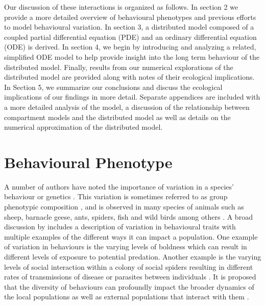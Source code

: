 \documentclass[review,authoryear]{elsarticle}
\begin{document}
Our discussion of these interactions is organized as follows. In section 2 we  provide a more detailed overview of behavioural phenotypes and previous efforts to model behavioural variation. In section 3, a distributed model composed of a coupled partial differential equation (PDE) and an ordinary differential equation (ODE) is derived. 
In section 4, we begin by introducing and analyzing a related, simplified ODE model to help provide insight into the long term behaviour of the distributed model. Finally, results from our numerical explorations of the distributed model are provided along with notes of their ecological implications. In Section 5, we summarize our conclusions and discuss the ecological implications of our findings in more detail.  Separate appendices are included with a more detailed analysis of the model, a discussion of the relationship between compartment models and the distributed model as well as details on the numerical approximation of the distributed model.

\section{Behavioural Phenotype}
\label{section:behaviouralPhenotype}

A number of authors have noted the importance of variation
in a species' behaviour or
genetics \citep{doi:10.1111/j.1461-0248.2010.01536.x,doi:10.1086/687235,mierzejewski_horn_luong_2019,SANTICCHIA20191,doi:10.1098/rspb.2014.1016}. This variation is sometimes referred to as group phenotypic composition \citep{FARINE2015609}, and is observed in many species of animals such as sheep, barnacle geese, ants, spiders, fish and wild birds among others \citep{sibbald2009individual,kurvers2011effect,modlmeier2012diverse,doi:10.1086/687235,doi:10.1098/rspb.2014.1016,doi:10.1037/0735-7036.107.3.250}.
A broad discussion by  \citet{doi:10.1111/j.1461-0248.2010.01536.x} includes a description of variation in behavioural traits with multiple examples of the different ways it can impact a population. One example of variation in behaviours is the varying levels of boldness which can result in different levels of exposure to potential predation. Another example is the varying levels of social interaction within a colony of social spiders resulting in different rates of transmissions of disease or parasites between individuals \citep{doi:10.1086/687235}. It is proposed that the diversity of
behaviours can profoundly impact the broader dynamics of the local populations as well as external populations that interact with them \citep{doi:10.1111/j.1461-0248.2010.01536.x}.
\end{document}
